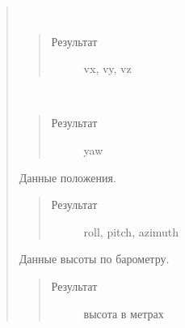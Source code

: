 \documentclass[a4paper,10pt,russian]{sphinxmanual}
\begin{document}
\begin{quote}
\begin{fulllineitems}
\begin{fulllineitems}
\end{fulllineitems}


\begin{fulllineitems}
\label{\detokenize{programming/lua/lua:Sensors.lpsVelocity}}~\begin{quote}\begin{description}
\item[{Результат}] \leavevmode
vx, vy, vz

\end{description}\end{quote}

\end{fulllineitems}


\begin{fulllineitems}
\label{\detokenize{programming/lua/lua:Sensors.lpsYaw}}~\begin{quote}\begin{description}
\item[{Результат}] \leavevmode
yaw

\end{description}\end{quote}

\end{fulllineitems}


\begin{fulllineitems}
\label{\detokenize{programming/lua/lua:Sensors.orientation}}
Данные положения.
\begin{quote}\begin{description}
\item[{Результат}] \leavevmode
roll, pitch, azimuth

\end{description}\end{quote}

\end{fulllineitems}


\begin{fulllineitems}
\label{\detokenize{programming/lua/lua:Sensors.altitude}}
Данные высоты по барометру.
\begin{quote}\begin{description}
\item[{Результат}] \leavevmode
высота в метрах


\end{description}
\end{quote}
\end{fulllineitems}
\end{fulllineitems}
\end{quote}
\end{document}
